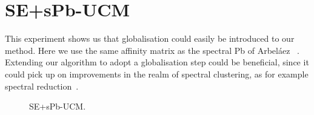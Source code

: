 \section*{SE+sPb-UCM}
This experiment shows us that globalisation could easily be introduced to our method. Here we use the same affinity matrix as the spectral Pb of Arbel\'aez \etal~\cite{Arbelaez11}. Extending our algorithm to adopt a globalisation step could be beneficial, since it could pick up on improvements in the realm of spectral clustering, as for example spectral reduction~\cite{Galasso14}. %

\begin{figure}[ht!]
\centering
\caption[(SE and spectralPb)-UCM plots]{SE+sPb-UCM.}
\label{fig:SE_nnms_sPb-UCM}
\end{figure}


